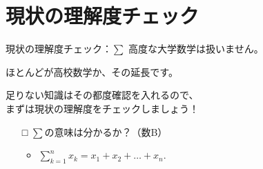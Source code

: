 \documentclass[dvipdfmx,aspectratio=169]{beamer}
\begin{document}
	\section{現状の理解度チェック}
	\begin{frame}{現状の理解度チェック：$ \displaystyle\sum $}
		高度な大学数学は扱いません。
		
		ほとんどが高校数学か、その延長です。
		
		足りない知識はその都度確認を入れるので、\\まずは現状の理解度をチェックしましょう！
		
		\hrulefill
		
		\begin{itemize}
			\item[□]
				$ \displaystyle\sum $の意味は分かるか？（数B）
				\begin{itemize}
					\item
					$ \displaystyle\sum_{k=1}^n x_k = x_1 + x_2 + \dots + x_n. $
				\end{itemize}
		\end{itemize}
	\end{frame}
\end{document}
